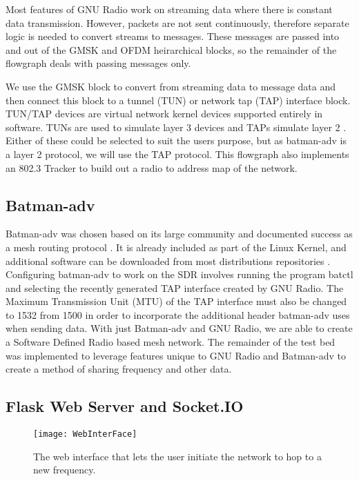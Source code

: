 Most features of GNU Radio work on streaming data where there is constant data transmission. However, packets are not sent continuously, therefore separate logic is needed to convert streams to messages. These messages are passed into and out of the GMSK and OFDM heirarchical blocks, so the remainder of the flowgraph deals with passing messages only. 

We use the GMSK block to convert from streaming data to message data and then connect this block to a tunnel (TUN) or network tap (TAP) interface block. TUN/TAP devices are virtual network kernel devices supported entirely in software. TUNs are used to simulate layer 3 devices and TAPs simulate layer 2 \cite{0017}. Either of these could be selected to suit the users purpose, but as batman-adv is a layer 2 protocol, we will use the TAP protocol. This flowgraph also implements an 802.3 Tracker to build out a radio to address map of the network. 

\subsection{Batman-adv}

Batman-adv was chosen based on its large community and documented success as a mesh routing protocol \cite{5375690}. It is already included as part of the Linux Kernel, and additional software can be downloaded from most distributions repositories \cite{0008}. Configuring batman-adv to work on the SDR involves running the program batctl and selecting the recently generated TAP interface created by GNU Radio. The Maximum Transmission Unit (MTU) of the TAP interface must also be changed to 1532 from 1500 in order to incorporate the additional header batman-adv uses when sending data. With just Batman-adv and GNU Radio, we are able to create a Software Defined Radio based mesh network. The remainder of the test bed was implemented to leverage features unique to GNU Radio and Batman-adv to create a method of sharing frequency and other data. 

\subsection{Flask Web Server and Socket.IO}

\begin{figure}
	\centering
	\texttt{[image: WebInterFace]}
	\caption{The web interface that lets the user initiate the network to hop to a new frequency.}
	\label{fig:WebInterface}
\end{figure}

